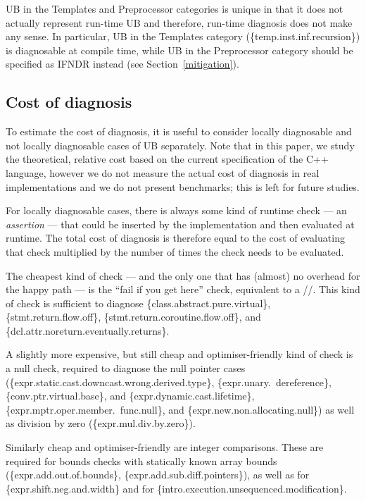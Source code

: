 UB in the Templates and Preprocessor categories is unique in that it does not actually represent run-time UB and therefore, run-time diagnosis does not make any sense. In particular, UB in the Templates category (\{temp.inst.inf.recursion\}) is diagnosable at compile time, while UB in the Preprocessor category should be specified as IFNDR instead (see Section~\ref{mitigation}).

\subsection{Cost of diagnosis}
\label{cost}

To estimate the cost of diagnosis, it is useful to consider locally diagnosable and not locally diagnosable cases of UB separately. Note that in this paper, we study the theoretical, relative cost based on the current specification of the C++ language, however we do not measure the actual cost of diagnosis in real implementations and we do not present benchmarks; this is left for future studies.

For locally diagnosable cases, there is always some kind of runtime check --- an \emph{assertion} --- that could be inserted by the implementation and then evaluated at runtime. The total cost of diagnosis is therefore equal to the cost of evaluating that check multiplied by the number of times the check needs to be evaluated.

The cheapest kind of check --- and the only one that has (almost) no overhead for the happy path --- is the ``fail if you get here'' check, equivalent to a //. This kind of check is sufficient to diagnose \{class.abstract.pure.virtual\}, \{stmt.return.flow.off\}, \{stmt.return.coroutine.flow.off\}, and \{dcl.attr.noreturn.eventually.returns\}.

A slightly more expensive, but still cheap and optimiser-friendly kind of check is a null check, required to diagnose the null pointer cases  
(\{expr.static.cast.downcast.wrong.derived.type\},
\{expr.unary.\ dereference\}, %
\{conv.ptr.virtual.base\}, and
\{expr.dynamic.cast.lifetime\}, 
\{expr.mptr.oper.member.\ func.null\}, and %
\{expr.new.non.allocating.null\})
as well as division by zero (\{expr.mul.div.by.zero\}).

Similarly cheap and optimiser-friendly are integer comparisons. These are  required for bounds checks with statically known array bounds
(\{expr.add.out.of.bounds\},
\{expr.add.sub.diff.pointers\}),
as well as for \{expr.shift.neg.and.width\} and for \{intro.execution.unsequenced.modification\}.

